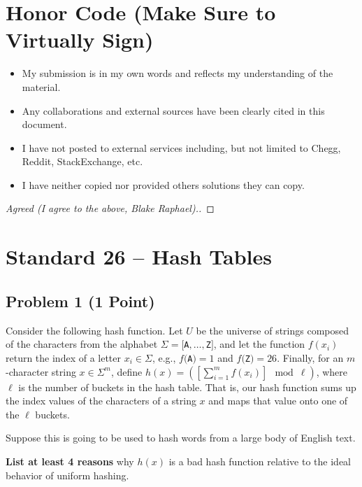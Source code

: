 \documentclass[11pt]{article}
\theoremstyle{definition}
\theoremstyle{definition}
\theoremstyle{definition}
\begin{document}
\section{Honor Code (Make Sure to Virtually Sign)} \label{HonorCode}

\begin{itemize}
\item My submission is in my own words and reflects my understanding of the material.
\item Any collaborations and external sources have been clearly cited in this document.
\item I have not posted to external services including, but not limited to Chegg, Reddit, StackExchange, etc.
\item I have neither copied nor provided others solutions they can copy.
\end{itemize}


\begin{proof}[Agreed (I agree to the above, Blake Raphael).]
\end{proof}
\newpage
\section{Standard 26 -- Hash Tables}

\subsection{Problem 1 (1 Point)}
Consider the following hash function. Let $U$ be the universe of strings composed of the characters from the alphabet $\Sigma=[${\tt A}$,\dots,${\tt Z}$]$, and let the function $f(x_{i})$ return the index of a letter $x_{i}\in \Sigma$, e.g., $f(${\tt A}$)=1$ and $f(${\tt Z}$)=26$. Finally, for an $m$-character string $x\in \Sigma^{m}$, define $h(x) = \left(\left[\sum_{i=1}^{m}f(x_{i})\right]\!\! \mod \ell\right)$, where $\ell$ is the number of buckets in the hash table. That is, our hash function sums up the index values of the characters of a string $x$ and maps that value onto one of the $\ell$ buckets.

Suppose this is going to be used to hash words from a large body of English text.
	
\textbf{List at least 4 reasons} why $h(x)$ is a bad hash function relative to the ideal behavior of uniform hashing.
\end{document}
